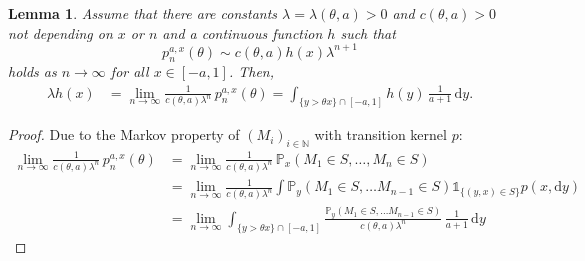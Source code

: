 \documentclass[12pt]{article}
\newcommand{\N}{\mathbb{N}} %
\renewcommand{\P}{\mathbb{P}} %
\newcommand{\1}{\mathds{1}}
\renewcommand{\d}{\mathrm{d}}
\theoremstyle{definition}
\theoremstyle{plain}
\newtheorem{Lemma}[definition]{Lemma}
\theoremstyle{remark}
\begin{document}
\begin{Lemma}\label{Prob=Lim_int_ef}
  Assume that there are constants $\lambda=\lambda(\theta,a)>0$ and $c(\theta,a)>0$ not depending on $x$ or $n$ and a continuous function $h$ such that
  $$p_n^{a,x}(\theta)\sim c(\theta,a)h(x)\lambda^{n+1}$$
  holds as $n\to\infty$ for all $x\in[-a,1]$. Then,
  \begin{align} \label{eqn:ppimplyeveqn}
    \lambda h(x) & =\lim_{n\to\infty}\frac{1}{c(\theta,a)\lambda^{n}}\, p_n^{a,x}(\theta) =\int_{\{y>\theta x\}\cap[-a,1]}h(y)\,\frac{1}{a+1}\,\d y.
  \end{align}
  \end{Lemma}
    \begin{proof}
  Due to the Markov property of $(M_i)_{i\in\N}$ with transition kernel $p$:
\begin{align*}%
     \lim_{n\to\infty}\frac{1}{c(\theta,a)\lambda^{n}} \, p_n^{a,x}(\theta)
      &=\lim_{n\to\infty}\frac{1}{c(\theta,a)\lambda^{n}}\,\P_x(M_1\in S,\dots,M_n\in S)
      \\&=\lim_{n\to\infty}\frac{1}{c(\theta,a)\lambda^{n}}\int\P_y(M_1\in S,\dots M_{n-1}\in S)\1_{\{(y,x)\in S\}}p(x,\d y)
      \\&=\lim_{n\to\infty}\int_{\{y>\theta x\}\cap[-a,1]}\frac{\P_y(M_1\in S,\dots M_{n-1}\in S)}{c(\theta,a)\lambda^{n}}\,\frac{1}{a+1}\,\d y

\end{align*}
\end{proof}
\end{document}
